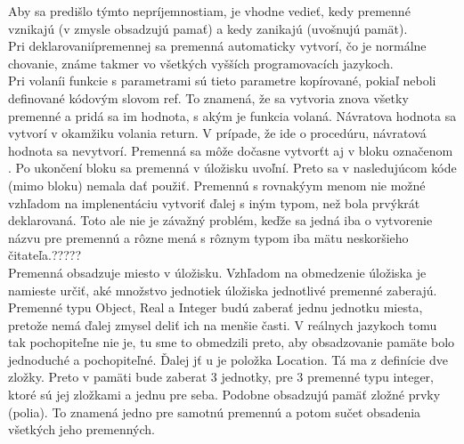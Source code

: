 Aby sa predišlo týmto nepríjemnostiam, je vhodne vedieť, kedy premenné vznikajú (v zmysle obsadzujú pamať) a kedy zanikajú (uvošnujú pamät). \\

Pri deklarovaniípremennej sa premenná automaticky vytvorí, čo je normálne chovanie, známe takmer vo všetkých vyšších programovacích jazykoch. \\
Pri volaníi funkcie s parametrami sú tieto parametre kopírované, pokiaľ neboli definované kódovým slovom ref. To znamená, že sa vytvoria znova všetky premenné a pridá sa im hodnota, s akým je funkcia volaná. Návratova hodnota sa vytvorí v okamžiku volania return. V prípade, že ide o procedúru, návratová hodnota sa nevytvorí.
Premenná sa môže dočasne vytvorťt aj v bloku označenom {}. Po ukončení bloku sa premenná v úložisku uvoľní. Preto sa v nasledujúcom kóde (mimo bloku) nemala dať použiť. Premennú s rovnakýym menom nie možné vzhľadom na implenentáciu vytvoriť ďalej s iným typom, než bola prvýkrát deklarovaná. Toto ale nie je závažný problém, keďže sa jedná iba o vytvorenie názvu pre premennú a rôzne mená s rôznym typom iba mätu neskoršieho čitateľa.?????\\

Premenná obsadzuje miesto v úložisku. Vzhľadom na obmedzenie úložiska je namieste určiť, aké množstvo jednotiek úložiska jednotlivé premenné zaberajú. Premenné typu Object, Real a Integer budú zaberať jednu jednotku miesta, pretože nemá ďalej zmysel deliť ich na menšie časti. V reálnych jazykoch tomu tak pochopiteľne nie je, tu sme to obmedzili preto, aby obsadzovanie pamäte bolo jednoduché a pochopiteľné. Ďalej jť u je položka Location. Tá ma z definície dve zložky. Preto v pamäti bude zaberat 3 jednotky, pre 3 premenné typu integer, ktoré sú jej zložkami a jednu pre seba. Podobne obsadzujú pamäť zložné prvky (polia). To znamená jedno pre samotnú premennú a potom sučet obsadenia všetkých jeho premenných. \\%

